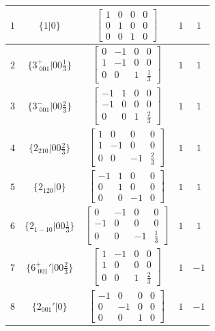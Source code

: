 \documentclass[fleqn,8pt]{jsarticle}
\begin{document}
\begin{longtable}{ccccc}
$ 1 $ & $ \{1|0\} $ & $ \begin{bmatrix} 1 & 0 & 0 & 0 \\ 0 & 1 & 0 & 0 \\ 0 & 0 & 1 & 0 \end{bmatrix} $ & $ 1 $ & $ 1 $ \\ \hline
$ 2 $ & $ \{3^{+}_{\,\,001}|0 0 \frac{1}{3}\} $ & $ \begin{bmatrix} 0 & -1 & 0 & 0 \\ 1 & -1 & 0 & 0 \\ 0 & 0 & 1 & \frac{1}{3} \end{bmatrix} $ & $ 1 $ & $ 1 $ \\ \hline
$ 3 $ & $ \{3^{-}_{\,\,001}|0 0 \frac{2}{3}\} $ & $ \begin{bmatrix} -1 & 1 & 0 & 0 \\ -1 & 0 & 0 & 0 \\ 0 & 0 & 1 & \frac{2}{3} \end{bmatrix} $ & $ 1 $ & $ 1 $ \\ \hline
$ 4 $ & $ \{2{}_{210}|0 0 \frac{2}{3}\} $ & $ \begin{bmatrix} 1 & 0 & 0 & 0 \\ 1 & -1 & 0 & 0 \\ 0 & 0 & -1 & \frac{2}{3} \end{bmatrix} $ & $ 1 $ & $ 1 $ \\ \hline
$ 5 $ & $ \{2{}_{120}|0\} $ & $ \begin{bmatrix} -1 & 1 & 0 & 0 \\ 0 & 1 & 0 & 0 \\ 0 & 0 & -1 & 0 \end{bmatrix} $ & $ 1 $ & $ 1 $ \\ \hline
$ 6 $ & $ \{2{}_{1-10}|0 0 \frac{1}{3}\} $ & $ \begin{bmatrix} 0 & -1 & 0 & 0 \\ -1 & 0 & 0 & 0 \\ 0 & 0 & -1 & \frac{1}{3} \end{bmatrix} $ & $ 1 $ & $ 1 $ \\ \hline
$ 7 $ & $ \{6^{+}_{\,\,001}{}'|0 0 \frac{2}{3}\} $ & $ \begin{bmatrix} 1 & -1 & 0 & 0 \\ 1 & 0 & 0 & 0 \\ 0 & 0 & 1 & \frac{2}{3} \end{bmatrix} $ & $ 1 $ & $ -1 $ \\ \hline
$ 8 $ & $ \{2{}_{001}{}'|0\} $ & $ \begin{bmatrix} -1 & 0 & 0 & 0 \\ 0 & -1 & 0 & 0 \\ 0 & 0 & 1 & 0 \end{bmatrix} $ & $ 1 $ & $ -1 $ \\ \hline

\end{longtable}
\end{document}
